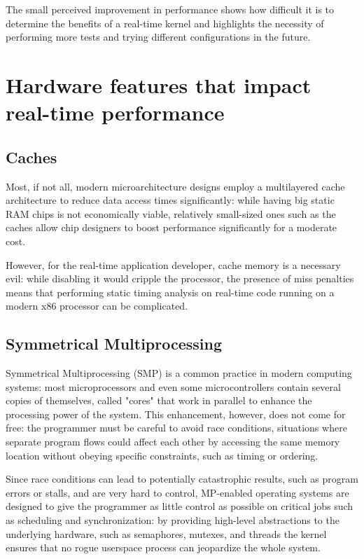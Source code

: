 \documentclass[a4paper,12pt]{report}
\begin{document}
The small perceived improvement in performance shows how difficult it is to determine the benefits of a real-time kernel and highlights the necessity of performing more tests and trying different configurations in the future.

\section{Hardware features that impact real-time performance}

\subsection{Caches}

Most, if not all, modern microarchitecture designs employ a multilayered cache architecture to reduce data access times significantly: while having big static RAM chips is not economically viable, relatively small-sized ones such as the caches allow chip designers to boost performance significantly for a moderate cost.

However, for the real-time application developer, cache memory is a necessary evil: while disabling it would cripple the processor, the presence of miss penalties means that performing static timing analysis on real-time code running on a modern x86 processor can be complicated.

\subsection{Symmetrical Multiprocessing}

Symmetrical Multiprocessing (SMP) is a common practice in modern computing systems: most microprocessors and even some microcontrollers contain several copies of themselves, called "cores" that work in parallel to enhance the processing power of the system. This enhancement, however, does not come for free: the programmer must be careful to avoid race conditions, situations where separate program flows could affect each other by accessing the same memory location without obeying specific constraints, such as timing or ordering. 

Since race conditions can lead to potentially catastrophic results, such as program errors or stalls, and are very hard to control, MP-enabled operating systems are designed to give the programmer as little control as possible on critical jobs such as scheduling and synchronization: by providing high-level abstractions to the underlying hardware, such as semaphores, mutexes, and threads the kernel ensures that no rogue userspace process can jeopardize the whole system.
\end{document}
